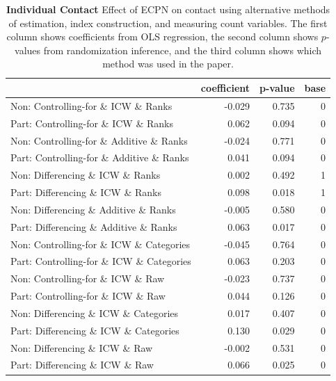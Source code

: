 \documentclass[
]{article}
\begin{document}
\begin{table}[H]
\begin{center}
\label{tab:contact_tab_ind}
\caption{\textbf{Individual Contact} Effect of ECPN on contact using alternative methods of estimation, index construction, and measuring count variables. The first column shows coefficients from OLS regression, the second column shows $p$-values from randomization inference, and the third column shows which method was used in the paper.}
\smallskip

\begin{tabular}{l|r|r|r}
\hline
  & coefficient & p-value & base\\
\hline
Non: Controlling-for \& ICW \& Ranks & -0.029 & 0.735 & 0\\
\hline
Part: Controlling-for \& ICW \& Ranks & 0.062 & 0.094 & 0\\
\hline
Non: Controlling-for \& Additive \& Ranks & -0.024 & 0.771 & 0\\
\hline
Part: Controlling-for \& Additive \& Ranks & 0.041 & 0.094 & 0\\
\hline
Non: Differencing \& ICW \& Ranks & 0.002 & 0.492 & 1\\
\hline
Part: Differencing \& ICW \& Ranks & 0.098 & 0.018 & 1\\
\hline
Non: Differencing \& Additive \& Ranks & -0.005 & 0.580 & 0\\
\hline
Part: Differencing \& Additive \& Ranks & 0.063 & 0.017 & 0\\
\hline
Non: Controlling-for \& ICW \& Categories & -0.045 & 0.764 & 0\\
\hline
Part: Controlling-for \& ICW \& Categories & 0.063 & 0.203 & 0\\
\hline
Non: Controlling-for \& ICW \& Raw & -0.023 & 0.737 & 0\\
\hline
Part: Controlling-for \& ICW \& Raw & 0.044 & 0.126 & 0\\
\hline
Non: Differencing \& ICW \& Categories & 0.017 & 0.407 & 0\\
\hline
Part: Differencing \& ICW \& Categories & 0.130 & 0.029 & 0\\
\hline
Non: Differencing \& ICW \& Raw & -0.002 & 0.531 & 0\\
\hline
Part: Differencing \& ICW \& Raw & 0.066 & 0.025 & 0\\
\hline
\end{tabular}


\end{center}
\end{table}
\end{document}
